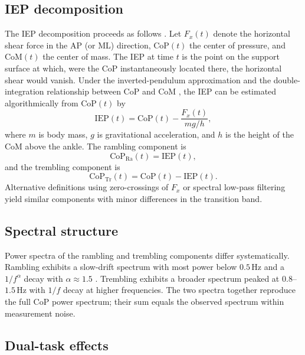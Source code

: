\documentclass[11pt,twocolumn,a4paper]{article}
\theoremstyle{definition}
\theoremstyle{remark}
\newcommand{\IEP}{\mathrm{IEP}}
\newcommand{\Ra}{\mathrm{Ra}}
\newcommand{\Tr}{\mathrm{Tr}}
\begin{document}
\subsection{IEP decomposition}

The IEP decomposition proceeds as follows \citep{zatsiorsky2000}.
Let $F_x(t)$ denote the horizontal shear force in the AP (or ML)
direction, $\mathrm{CoP}(t)$ the center of pressure, and
$\mathrm{CoM}(t)$ the center of mass. The IEP at time $t$ is the
point on the support surface at which, were the CoP instantaneously
located there, the horizontal shear would vanish. Under the
inverted-pendulum approximation and the double-integration
relationship between CoP and CoM \citep{winter1998,morasso2002}, the
IEP can be estimated algorithmically from $\mathrm{CoP}(t)$ by
\begin{equation}
\IEP(t) = \mathrm{CoP}(t) - \frac{F_x(t)}{m g / h},
\label{eq:iep}
\end{equation}
where $m$ is body mass, $g$ is gravitational acceleration, and
$h$ is the height of the CoM above the ankle. The rambling
component is
\begin{equation}
\mathrm{CoP}_{\Ra}(t) = \IEP(t),
\end{equation}
and the trembling component is
\begin{equation}
\mathrm{CoP}_{\Tr}(t) = \mathrm{CoP}(t) - \IEP(t).
\label{eq:trembling}
\end{equation}
Alternative definitions using zero-crossings of $F_x$ or spectral
low-pass filtering yield similar components with minor differences
in the transition band.

\subsection{Spectral structure}

Power spectra of the rambling and trembling components differ
systematically. Rambling exhibits a slow-drift spectrum with most
power below $0.5$\,Hz and a $1/f^{\alpha}$ decay with
$\alpha \approx 1.5$ \citep{duarte2008,collins1993}. Trembling
exhibits a broader spectrum peaked at $0.8$--$1.5$\,Hz with
$1/f$ decay at higher frequencies. The two spectra together
reproduce the full CoP power spectrum; their sum equals the
observed spectrum within measurement noise.

\subsection{Dual-task effects}
\end{document}

